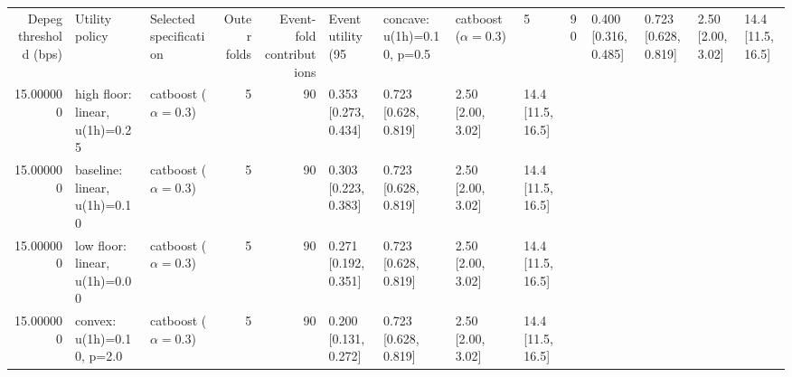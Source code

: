 \begin{tabular}{rllrrllll}
\toprule
Depeg threshold (bps) & Utility policy & Selected specification & Outer folds & Event-fold contributions & Event utility (95%
 & concave: u(1h)=0.10, p=0.5 & catboost ($\alpha=0.3$) & 5 & 90 & 0.400 [0.316, 0.485] & 0.723 [0.628, 0.819] & 2.50 [2.00, 3.02] & 14.4 [11.5, 16.5] \\
15.000000 & high floor: linear, u(1h)=0.25 & catboost ($\alpha=0.3$) & 5 & 90 & 0.353 [0.273, 0.434] & 0.723 [0.628, 0.819] & 2.50 [2.00, 3.02] & 14.4 [11.5, 16.5] \\
15.000000 & baseline: linear, u(1h)=0.10 & catboost ($\alpha=0.3$) & 5 & 90 & 0.303 [0.223, 0.383] & 0.723 [0.628, 0.819] & 2.50 [2.00, 3.02] & 14.4 [11.5, 16.5] \\
15.000000 & low floor: linear, u(1h)=0.00 & catboost ($\alpha=0.3$) & 5 & 90 & 0.271 [0.192, 0.351] & 0.723 [0.628, 0.819] & 2.50 [2.00, 3.02] & 14.4 [11.5, 16.5] \\
15.000000 & convex: u(1h)=0.10, p=2.0 & catboost ($\alpha=0.3$) & 5 & 90 & 0.200 [0.131, 0.272] & 0.723 [0.628, 0.819] & 2.50 [2.00, 3.02] & 14.4 [11.5, 16.5] \\
\bottomrule
\end{tabular}
